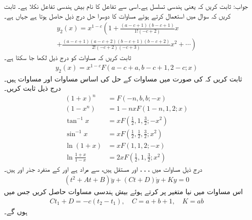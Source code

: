 جواب:
ثابت کریں کہ  یعنی ہندسی تسلسل ہے۔اسی سے تفاعل  کا نام بیش ہندسی تفاعل نکلا ہے۔
ثابت کریں کہ سوال  میں  استعمال کرتے ہوئے مساوات  کا دوسرا حل درج ذیل حاصل ہوتا ہے جہاں  ہے۔
\begin{multline}\label{مساوات_بیسل_بیش_ہندسی_حل_ب}
y_2(x)=x^{1-c}\left(1+\frac{(a-c+1)(b-c+1)}{1!(-c+2)}x\right.\\
\left.+\frac{(a-c+1)(a-c+2)(b-c+1)(b-c+2)}{2!(-c+2)(-c+3)}x^2+\cdots\right)
\end{multline}
ثابت کریں کہ مساوات  کو درج ذیل لکھا جا سکتا ہے۔
\begin{align}\label{مساوات_بیسل_بیش_ہندسی_حل_پ}
y_2(x)=x^{1-c}F(a-c+a,b-c+1,2-c;x)
\end{align}
ثابت کریں کہ  کی صورت میں مساوات  کے حل کی اساس مساوات  اور مساوات  ہیں۔
درج ذیل ثابت کریں۔
\begin{align*}
(1+x)^n&=F(-n,b,b;-x)\\
(1-x^n)&=1-nxF(1-n,1,2;x)\\
\tan^{-1} x&=xF(\tfrac{1}{2},1,\tfrac{3}{2};-x^2)\\
\sin^{-1} x&=xF(\tfrac{1}{2},\tfrac{1}{2},\tfrac{3}{2};x^2)\\
\ln(1+x)&=xF(1,1,2;-x)\\
\ln \frac{1+x}{1-x}&=2xF(\tfrac{1}{2},1,\tfrac{3}{2};x^2)
\end{align*}
درج ذیل مساوات میں ، ، ،  اور  مستقل ہیں،  سے مراد  ہے  اور  کے منفرد جذر  اور  ہیں۔
\begin{align}
(t^2+At+B)\ddot{y}+(Ct+D)\dot{y}+Ky=0
\end{align}
اس مساوات میں  نیا متغیر  پر کرتے ہوئے بیش ہندسی مساوات حاصل کریں جس میں
\begin{align*}
Ct_1+D=-c(t_2-t_1), \quad C=a+b+1, \quad K=ab
\end{align*}
ہوں گے۔

